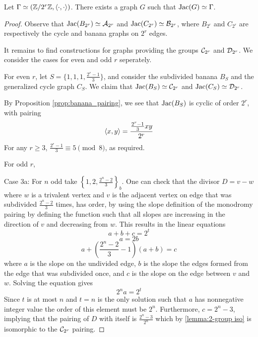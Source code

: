 \documentclass{amsart}
\begin{document}
\begin{thm} Let $\Gamma \simeq (\mathbb{Z}/2^r\mathbb{Z},
  \langle \cdot, \cdot \rangle)$. There exists a graph $G$ such that $\operatorname{Jac}(G)
  \simeq \Gamma$. 
\end{thm}

\begin{proof}
  Observe that $\operatorname{Jac}(B_{2^r}) \simeq \mathcal{A}_{2^{r}}$ and $\operatorname{Jac}(C_{2^r}) \simeq
  \mathcal{B}_{2^{r}}$, where $B_{2^r}$ and $C_{2^r}$ are respectively the cycle and
  banana graphs on $2^r$ edges.

  It remains to find constructions for graphs providing the groups
  $\mathcal{C}_{2^{r}}$ and $\mathcal{D}_{2^{r}}$. We consider the cases for even and odd $r$
  seperately.


  For even $r$, let $S = \{1, 1, 1, \frac{2^r - 1}{3}\}$, and consider
  the subdivided banana $B_S$ and the generalized cycle graph
  $C_S$. We claim that $\operatorname{Jac}(B_S) \simeq \mathcal{C}_{2^{r}}$ and $\operatorname{Jac}(C_S) \simeq
  \mathcal{D}_{2^{r}}$. 

  By Proposition \ref{prop:banana_pairing}, we see that $\operatorname{Jac}(B_S)$ is
  cyclic of order $2^r$, with pairing
  \begin{equation*}
    \langle x, y \rangle = \dfrac{\frac{2^r-1}{3}xy}{2^r}
  \end{equation*}
  For any $r \ge 3$, $\frac{2^r - 1}{3} \equiv 5 \pmod 8$, as required.

  For odd $r$, 

  Case 3a: For $n$ odd take $\left\{1,
    2,\frac{2^{n}-2}{3}\right\}_{b}$. One can check that the divisor
  $D=v-w$ where $w$ is a trivalent vertex and $v$ is the adjacent
  vertex on edge that was subdivided $\frac{2^{n}-2}{3}$ times, has
  order, by using the slope definition of the monodromy pairing by
  defining the function such that all slopes are increasing in the
  direction of $v$ and decreasing from $w$. This results in the linear
  equations
  \begin{equation*}
a+b+c=2^{t}
  \end{equation*}
  \begin{equation*}
a=2b
  \end{equation*}
  \begin{equation*}
a+\left(\frac{2^{n}-2}{3}-1\right)(a+b)=c
  \end{equation*}
where $a$ is the slope on the undivided edge, $b$ is the
slope the edges formed from the edge that was subdivided once, and $c$ is the slope
on the edge between $v$ and $w$. Solving the equation gives
\begin{equation*}
2^{n}a=2^{t}
\end{equation*}
Since $t$ is at most $n$ and $t=n$ is the only solution such that $a$
has nonnegative integer value the order of this element must be
$2^{n}$. Furthermore, $c=2^{n}-3$, implying that the pairing of $D$
with itself is $\frac{2^{n}-3}{2^{n}}$ which by \ref{lemma:2-group
  iso} is isomorphic to the $\mathcal{C}_{2^{r}}$ pairing.


\end{proof}
\end{document}

